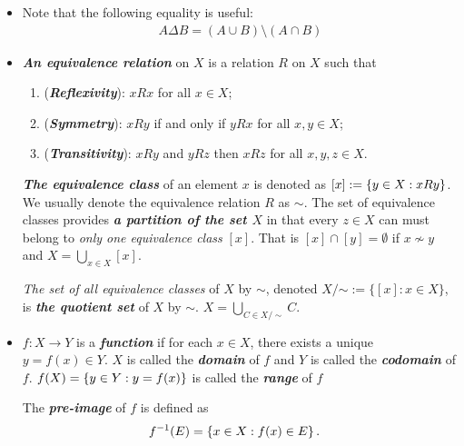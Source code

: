 \documentclass[11pt]{article}
\begin{document}
\begin{itemize}
\item \begin{remark}
Note that the following equality is useful:
\begin{align*}
A \Delta B = (A \cup B) \setminus (A \cap B)
\end{align*}
\end{remark}

\item \begin{definition}
\emph{\textbf{An equivalence relation}} on $X$ is a relation $R$ on $X$ such that 
\begin{enumerate}
\item (\emph{\textbf{Reflexivity}}): $xRx$ for all $x \in X$;
\item (\emph{\textbf{Symmetry}}): $xRy$ if and only if $yRx$ for all $x,y \in X$;
\item (\emph{\textbf{Transitivity}}): $xRy$ and $yRz$ then $xRz$ for all $x,y,z \in X$. 
\end{enumerate}
\emph{\textbf{The equivalence class}} of an element $x$ is denoted as $[x] := \left\{y \in X:  xRy\right\}$. We usually denote the equivalence relation $R$ as $\sim$. The set of equivalence classes provides \emph{\textbf{a partition of the set $X$}} in that every $z \in X$ can must belong to \emph{only one equivalence class} $[x]$. That is $[x] \cap [y] = \emptyset$ if $x \not\sim y$ and $X = \bigcup_{x \in X}[x]$.

\emph{The set of all equivalence classes} of $X$ by $\sim$, denoted $X/{\mathord {\sim }}:= \{[x]: x \in X \}$, is \emph{\textbf{the quotient set}} of $X$ by $\sim$.  $X = \bigcup_{C \in X/\sim}C.$
\end{definition}

\item \begin{definition} 
$f: X\rightarrow Y$ is a \emph{\textbf{function}} if for each $x \in X$, there exists a unique $y = f(x) \in Y$. $X$ is called the \emph{\textbf{domain}} of $f$ and $Y$ is called the  \emph{\textbf{codomain}} of $f$. $f(X) = \left\{y \in Y: y = f(x)\right\}$ is called the \emph{\textbf{range}} of $f$

The \emph{\textbf{pre-image}} of $f$ is defined as
\begin{align*}
f^{-1}(E) &= \left\{x \in X: f(x) \in E\right\}.
\end{align*}
\end{definition}



\end{itemize}
\end{document}
